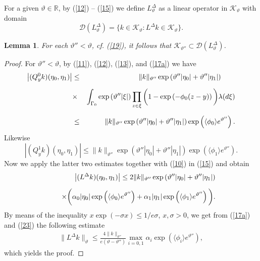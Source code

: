 \documentclass[reqno,11pt]{amsart}
\newtheorem{lemma}[theorem]{Lemma}
\theoremstyle{definition}
\theoremstyle{remark}
\numberwithin{equation}{section}
\begin{document}
For a given $\vartheta\in \mathds{R}$, by (\ref{12}) -- (\ref{15})
we define $L^\Delta_\vartheta$ as a linear operator in
$\mathcal{K}_\vartheta$ with domain
\begin{equation}
  \label{20}
\mathcal{D} (L^\Delta_\vartheta) = \{ k\in \mathcal{K}_\vartheta:
L^\Delta k \in \mathcal{K}_\vartheta\}.
\end{equation}
\begin{lemma}
  \label{1lm}
For each $\vartheta'' < \vartheta$, cf. (\ref{19}), it follows that
$\mathcal{K}_{\vartheta''} \subset \mathcal{D}
(L^\Delta_\vartheta)$.
\end{lemma}
\begin{proof}
For $\vartheta'' < \vartheta$, by (\ref{11}), (\ref{12}),
(\ref{13}), and (\ref{17a}) we have
\begin{eqnarray}
  \label{21}
\left\vert (Q^0_y k)(\eta_0, \eta_1)\right\vert   & \leq &
\|k\|_{\vartheta''} \exp\left(  \vartheta'' |\eta_0| + \vartheta''
|\eta_1|\right) \qquad  \\[.2cm] & \times & \int_{\Gamma_0} \exp\left(  \vartheta'' |\xi|\right) \prod_{z\in \xi}
\bigg{(} 1 - \exp\left( - \phi_0 (z-y)\right)\bigg{)} \lambda (
d\xi)\nonumber \\[.2cm]
& \leq & \|k\|_{\vartheta''} \exp\left(  \vartheta'' |\eta_0| +
\vartheta'' |\eta_1|\right) \exp\left(\langle \phi_{0} \rangle
e^{\vartheta''} \right) . \nonumber
\end{eqnarray}
Likewise
\begin{equation}
  \label{22}
\left\vert (Q^1_y k)(\eta_0, \eta_1)\right\vert \leq
\|k\|_{\vartheta''} \exp\left( \vartheta'' |\eta_0| + \vartheta''
|\eta_1|\right) \exp\left(\langle \phi_{1} \rangle e^{\vartheta''}
\right) .
\end{equation}
Now we apply the latter two estimates together with (\ref{10}) in
(\ref{15}) and obtain
\begin{eqnarray}
  \label{23}
& & \left\vert (L^\Delta k)(\eta_0, \eta_1)\right\vert \leq 2
\|k\|_{\vartheta''} \exp\left(  \vartheta'' |\eta_0| + \vartheta''
|\eta_1|\right) \\[.2cm]
& & \quad \times \bigg{(} \alpha_0 |\eta_0| \exp\left(\langle
\phi_{0} \rangle e^{\vartheta''} \right) + \alpha_1 |\eta_1|
\exp\left(\langle \phi_{1} \rangle e^{\vartheta''} \right) \bigg{)}.
\nonumber
\end{eqnarray}
By means of the inequality $x\exp(-\sigma x) \leq 1/ e \sigma$, $x,
\sigma
>0$, we get from (\ref{17a}) and (\ref{23}) the following estimate
\begin{gather}
  \label{24}
 \|L^\Delta k\|_{\vartheta}  \leq  \frac{4\|k\|_{\vartheta''}}{e(\vartheta - \vartheta'')}
 \max_{i=0,1}\alpha_i \exp\left(
\langle \phi_{i} \rangle e^{\vartheta''}\right),
\end{gather}
which yields the proof.
\end{proof}
\end{document}

